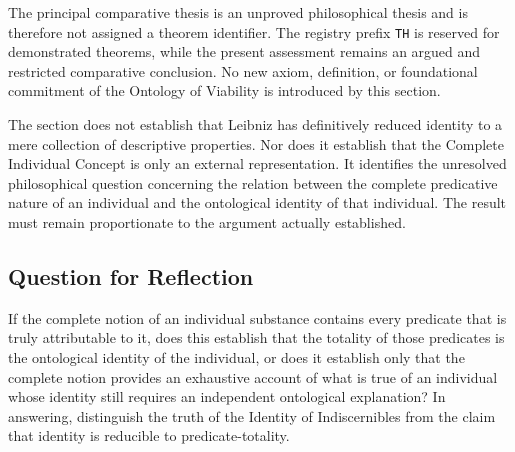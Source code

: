 The principal comparative thesis is an
unproved philosophical thesis and is
therefore not assigned a theorem identifier.
The registry prefix \texttt{TH} is reserved
for demonstrated theorems, while the
present assessment remains an argued
and restricted comparative conclusion.
No new axiom, definition, or foundational
commitment of the Ontology of Viability
is introduced by this section.

\label{para:VS.B01.P01.C08.S07.SS12.P004}

The section does not establish that
Leibniz has definitively reduced identity
to a mere collection of descriptive
properties. Nor does it establish that
the Complete Individual Concept is
only an external representation. It
identifies the unresolved philosophical
question concerning the relation between
the complete predicative nature of an
individual and the ontological identity
of that individual. The result must
remain proportionate to the argument
actually established.



\subsection*{Question for Reflection}

\label{para:VS.B01.P01.C08.S07.SS13.P001}

If the complete notion of an individual
substance contains every predicate that
is truly attributable to it, does this
establish that the totality of those
predicates is the ontological identity
of the individual, or does it establish
only that the complete notion provides
an exhaustive account of what is true
of an individual whose identity still
requires an independent ontological
explanation? In answering, distinguish
the truth of the Identity of Indiscernibles
from the claim that identity is reducible
to predicate-totality.

